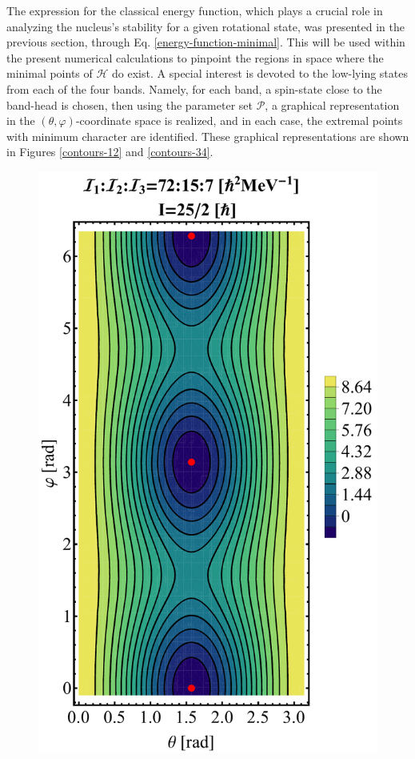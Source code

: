 \documentclass[myclassdoc,debug]{rjparticle}
\begin{document}
The expression for the classical energy function, which plays a crucial role in analyzing the nucleus's stability for a given rotational state, was presented in the previous section, through Eq. \ref{energy-function-minimal}. This will be used within the present numerical calculations to pinpoint the regions in space where the minimal points of $\mathcal{H}$ do exist. A special interest is devoted to the low-lying states from each of the four bands. Namely, for each band, a spin-state close to the band-head is chosen, then using the parameter set $\mathcal{P}$, a graphical representation in the $(\theta,\varphi)$-coordinate space is realized, and in each case, the extremal points with minimum character are identified. These graphical representations are shown in Figures \ref{contours-12} and \ref{contours-34}.

\begin{figure}
\centering
\begin{minipage}{.5\textwidth}
  \centering
  \includegraphics[scale=0.2]{figs/contour-tsd1.pdf}

\end{minipage}
\end{figure}
\end{document}
